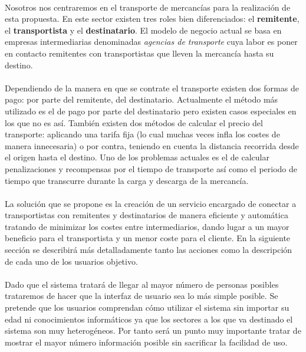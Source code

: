 \documentclass[10pt, a4paper,spanish]{article}
\begin{document}
			\paragraph{}
			Nosotros nos centraremos en el transporte de mercancías para la realización de esta propuesta. En este sector existen tres roles bien diferenciados: el \textbf{remitente}, el \textbf{transportista} y el \textbf{destinatario}. El modelo de negocio actual se basa en empresas intermediarias denominadas \textit{agencias de transporte} cuya labor es poner en contacto remitentes con transportistas que lleven la mercancía hasta su destino.

			\paragraph{}
			Dependiendo de la manera en que se contrate el transporte existen dos formas de pago: por parte del remitente, del destinatario. Actualmente el método más utilizado es el de pago por parte del destinatario pero existen casos especiales en los que no es así. También existen dos métodos de calcular el precio del transporte: aplicando una tarifa fija (lo cual muchas veces infla los costes de manera innecesaria) o por contra, teniendo en cuenta la distancia recorrida desde el origen hasta el destino. Uno de los problemas actuales es el de calcular penalizaciones y recompensas por el tiempo de transporte así como el periodo de tiempo que transcurre durante la carga y descarga de la mercancía.

			\paragraph{}
			La solución que se propone es la creación de un servicio encargado de conectar a transportistas con remitentes y destinatarios de manera eficiente y automática tratando de minimizar los costes entre intermediarios, dando lugar a un mayor beneficio para el transportista y un menor coste para el cliente. En la siguiente sección se describirá más detalladamente tanto las acciones como la descripción de cada uno de los usuarios objetivo.

			\paragraph{}
			Dado que el sistema tratará de llegar al mayor número de personas posibles trataremos de hacer que la interfaz de usuario sea lo más simple posible.
			Se pretende que los usuarios comprendan cómo utilizar el sistema sin importar su edad ni conocimientos informáticos ya que los sectores a los que va destinado el sistema son muy heterogéneos. Por tanto será un punto muy importante tratar de mostrar el mayor número información posible sin sacrificar la facilidad de uso.
\end{document}
